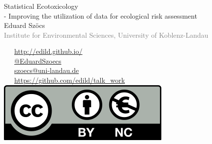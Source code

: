 \documentclass[12pt, t]{beamer}
\begin{document}
\begin{frame}
\frametitle{}
\vspace{1em}
\begin{centering}
\Large \textcolor{title}{Statistical Ecotoxicology \\ - Improving the utilization of data for ecological risk assessment} \\[1em]
Eduard Szöcs \\[0.3em]
\tiny \textcolor{gray}{Institute for Environmental Sciences, University of Koblenz-Landau} \\[5em]
\end{centering}
\normalsize
\textcolor{hilight}{\faLaptop}~~~\href{http://edild.github.io/}{http://edild.github.io/ }\\[.5em]
\textcolor{hilight}{\faTwitter}~~~\href{http://twitter.com/EduardSzoecs}{@EduardSzoecs} 	\\[0.5em]
\textcolor{hilight}{\faEnvelope}~~~\href{mailto:szoecs@uni-landau.de}{szoecs@uni-landau.de} \\[.5em]
\textcolor{hilight}{\faGift}~~~\href{https://github.com/edild/talk_work2}{https://github.com/edild/talk\_work}\\[0.5em]
\hfill \includegraphics[width =.3\textwidth]{fig/Cc-by-nc_euro_icon.png} 
\end{frame}
\end{document}
